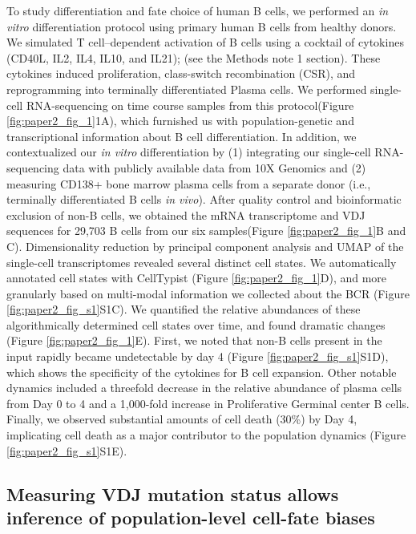 To study differentiation and fate choice of human B cells, we performed an \textit{in vitro} differentiation protocol using primary human B cells from healthy donors. We simulated T cell–dependent activation of B cells using a cocktail of cytokines (CD40L, IL2, IL4, IL10, and IL21); (see the Methods note 1 section). These cytokines induced proliferation, class-switch recombination (CSR), and reprogramming into terminally differentiated Plasma cells. We performed single-cell RNA-sequencing on time course samples from this protocol(Figure \ref{fig:paper2_fig_1}1A), which furnished us with population-genetic and transcriptional information about B cell differentiation. In addition, we contextualized our \textit{in vitro} differentiation by (1) integrating our single-cell RNA-sequencing data with publicly available data from 10X Genomics and (2) measuring CD138+ bone marrow plasma cells from a separate donor (i.e., terminally differentiated B cells \textit{in vivo}). After quality control and bioinformatic exclusion of non-B cells, we obtained the mRNA transcriptome and VDJ sequences for 29,703 B cells from our six samples(Figure \ref{fig:paper2_fig_1}B and C).
Dimensionality reduction by principal component analysis and UMAP\cite{mcinnes_umap_2018} of the single-cell transcriptomes revealed several distinct cell states. We automatically annotated cell states with CellTypist (Figure \ref{fig:paper2_fig_1}D)\cite{dominguez_conde_cross-tissue_2022}, and more granularly based on multi-modal information we collected about the BCR (Figure \ref{fig:paper2_fig_s1}S1C). We quantified the relative abundances of these algorithmically determined cell states over time, and found dramatic changes (Figure \ref{fig:paper2_fig_1}E). First, we noted that non-B cells present in the input rapidly became undetectable by day 4 (Figure \ref{fig:paper2_fig_s1}S1D), which shows the specificity of the cytokines for B cell expansion. Other notable dynamics included a threefold decrease in the relative abundance of plasma cells from Day 0 to 4 and a 1,000-fold increase in Proliferative Germinal center B cells. Finally, we observed substantial amounts of cell death (30\%) by Day 4, implicating cell death as a major contributor to the population dynamics (Figure \ref{fig:paper2_fig_s1}S1E).


\subsection{Measuring VDJ mutation status allows inference of population-level cell-fate biases}

